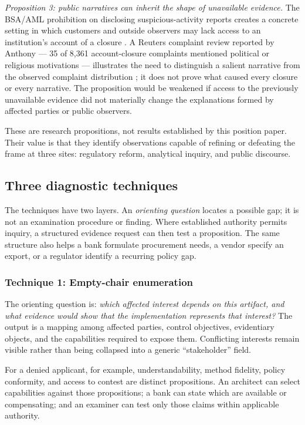 \emph{Proposition 3: public narratives can inherit the shape of unavailable
evidence.} The BSA/AML prohibition on disclosing suspicious-activity reports
creates a concrete setting in which customers and outside observers may lack
access to an institution's account of a closure \parencite{usc31_5318g2}.
A Reuters complaint review reported by Anthony --- 35 of 8,361
account-closure complaints mentioned political or religious motivations ---
illustrates the need to distinguish a salient narrative from the observed
complaint distribution \parencite{anthony2026}; it does not prove what caused
every closure or every narrative. The proposition would be weakened if access to the previously
unavailable evidence did not materially change the explanations formed by
affected parties or public observers.

These are research propositions, not results established by this position
paper. Their value is that they identify observations capable of refining or
defeating the frame at three sites: regulatory reform, analytical inquiry, and
public discourse.

\subsection{Three diagnostic techniques}
\label{sec:diagnostics:three-techniques}

The techniques have two layers. An \emph{orienting question} locates a possible
gap; it is not an examination procedure or finding. Where established authority
permits inquiry, a structured evidence request can then test a proposition. The
same structure also helps a bank formulate procurement needs, a vendor specify
an export, or a regulator identify a recurring policy gap.

\subsubsection{Technique 1: Empty-chair enumeration}
\label{sec:diagnostics:enumeration}

The orienting question is: \emph{which affected interest depends on this
artifact, and what evidence would show that the implementation represents that
interest?} The output is a mapping among affected parties, control objectives,
evidentiary objects, and the capabilities required to expose them. Conflicting
interests remain visible rather than being collapsed into a generic
``stakeholder'' field.

For a denied applicant, for example, understandability, method fidelity,
policy conformity, and access to contest are distinct propositions. An
architect can select capabilities against those propositions; a bank can state
which are available or compensating; and an examiner can test only those claims
within applicable authority.

